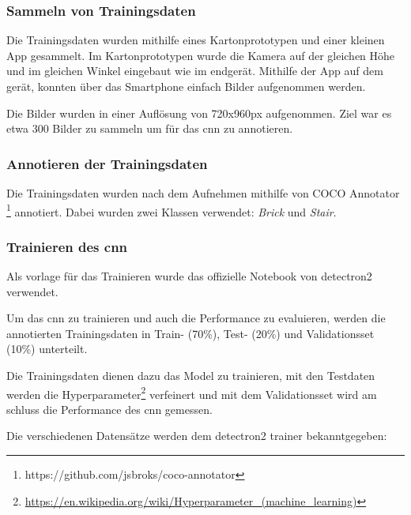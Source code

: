 \subsubsection{Sammeln von Trainingsdaten}

Die Trainingsdaten wurden mithilfe eines Kartonprototypen und einer kleinen App gesammelt.
Im Kartonprototypen wurde die Kamera auf der gleichen Höhe und im gleichen Winkel eingebaut
wie im endgerät.
Mithilfe der App auf dem gerät, konnten über das Smartphone einfach Bilder aufgenommen werden.

Die Bilder wurden in einer Auflösung von 720x960px aufgenommen. Ziel war es etwa 300 Bilder zu sammeln um für das \acrshort{cnn} zu annotieren.


\subsubsection{Annotieren der Trainingsdaten}

Die Trainingsdaten wurden nach dem Aufnehmen mithilfe von COCO Annotator \footnote{https://github.com/jsbroks/coco-annotator} annotiert.
Dabei wurden zwei Klassen verwendet: {\it Brick} und {\it Stair}.


\subsubsection{Trainieren des \acrshort{cnn}}

Als vorlage für das Trainieren wurde das offizielle Notebook von detectron2 verwendet. \cite{detectron2-colab}

Um das \acrshort{cnn} zu trainieren und auch die Performance zu evaluieren, werden die annotierten Trainingsdaten
in Train- (70\%), Test- (20\%) und Validationsset (10\%) unterteilt.

Die Trainingsdaten dienen dazu das Model zu trainieren, mit den Testdaten werden die Hyperparameter\footnote{\url{https://en.wikipedia.org/wiki/Hyperparameter_(machine_learning)}} verfeinert und
mit dem Validationsset wird am schluss die Performance des \acrshort{cnn} gemessen.

Die verschiedenen Datensätze werden dem detectron2 trainer bekanntgegeben:

